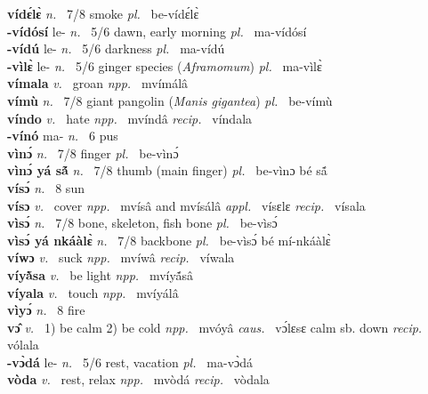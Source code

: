 {\bfseries vídɛ́lɛ̀}  {\itshape n.~} 7/8 smoke {\itshape pl.~} be-vídɛ́lɛ̀    \\ 
{\bfseries -vídósí} le- {\itshape n.~} 5/6 dawn, early morning {\itshape pl.~} ma-vídósí    \\ 
{\bfseries -vídú} le- {\itshape n.~} 5/6 darkness {\itshape pl.~} ma-vídú    \\ 
{\bfseries -vìlɛ̀} le- {\itshape n.~} 5/6 ginger species ({\itshape Aframomum}) {\itshape pl.~} ma-vìlɛ̀    \\ 
{\bfseries vímala}  {\itshape v.~} groan   {\itshape npp.~} mvímálâ  \\ 
{\bfseries vímù}  {\itshape n.~} 7/8 giant pangolin ({\itshape Manis gigantea}) {\itshape pl.~} be-vímù    \\ 
{\bfseries víndo}  {\itshape v.~} hate   {\itshape npp.~} mvíndâ {\itshape recip.~} víndala  \\ 
{\bfseries -vínó} ma- {\itshape n.~} 6 pus    \\ 
{\bfseries vìnɔ́}  {\itshape n.~} 7/8 finger {\itshape pl.~} be-vìnɔ́    \\ 
{\bfseries vìnɔ́ yá sã́}  {\itshape n.~} 7/8 thumb (main finger) {\itshape pl.~} be-vìnɔ bé sã́   \\ 
{\bfseries vísɔ́}  {\itshape n.~} 8 sun    \\ 
{\bfseries vísɔ}  {\itshape v.~} cover   {\itshape npp.~} mvísâ and mvísálâ {\itshape appl.~} vísɛlɛ {\itshape recip.~} vísala  \\ 
{\bfseries vìsɔ́}  {\itshape n.~} 7/8 bone, skeleton, fish bone {\itshape pl.~} be-vìsɔ́    \\ 
{\bfseries vìsɔ́ yá nkáàlɛ̀}  {\itshape n.~} 7/8 backbone {\itshape pl.~} be-vìsɔ́ bé mí-nkáàlɛ̀    \\ 
{\bfseries víwɔ}  {\itshape v.~} suck   {\itshape npp.~} mvíwâ {\itshape recip.~} víwala  \\ 
{\bfseries víyã̀sa}  {\itshape v.~} be light   {\itshape npp.~} mvíyã́sâ  \\ 
{\bfseries víyala}  {\itshape v.~} touch   {\itshape npp.~} mvíyálâ  \\ 
{\bfseries vìyɔ́}  {\itshape n.~} 8 fire \\ 
{\bfseries vɔ̂}  {\itshape v.~} 1) be calm 2) be cold   {\itshape npp.~} mvóyâ {\itshape caus.~} vɔ́lɛsɛ calm sb. down {\itshape recip.~} vólala  \\ 
{\bfseries -vɔ̀dá} le- {\itshape n.~} 5/6 rest, vacation {\itshape pl.~} ma-vɔ̀dá    \\ 
{\bfseries vòda}  {\itshape v.~} rest, relax   {\itshape npp.~} mvòdá {\itshape recip.~} vòdala  \\ 
